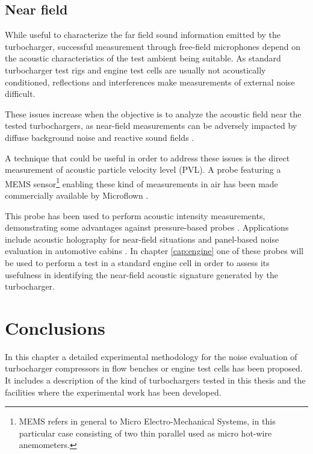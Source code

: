 \subsection{Near field} %

While useful to characterize the far field sound information emitted by the turbocharger, successful measurement through free-field microphones depend on the acoustic characteristics of the test ambient being suitable. As standard turbocharger test rigs and engine test cells are usually not acoustically conditioned, reflections and interferences make measurements of external noise difficult. 

These issues increase when the objective is to analyze the acoustic field near the tested turbochargers, as near-field measurements can be adversely impacted by diffuse background noise and reactive sound fields \cite{jacobsen1989active,elliot1981errors}. 

A technique that could be useful in order to address these issues is the direct measurement of acoustic particle velocity level (PVL). A probe featuring a MEMS sensor\footnote{MEMS refers in general to Micro Electro-Mechanical Systems, in this particular case consisting of two thin parallel used as micro hot-wire anemometers.} enabling these kind of measurements in air has been made commercially available by Microflown \cite{debree1992micro}. 

This probe has been used to perform acoustic intensity measurements, demonstrating some advantages against pressure-based probes \cite{jacobsen2005comp}. Applications include acoustic holography for near-field situations \cite{comesana2013scan} and panel-based noise evaluation in automotive cabins \cite{Wolff2009PU}. In chapter \ref{cap:engine} one of these probes will be used to perform a test in a standard engine cell in order to assess its usefulness in identifying the near-field acoustic signature generated by the turbocharger.

\section{Conclusions}
\label{sec:conclusions}

In this chapter a detailed experimental methodology for the noise evaluation of turbocharger compressors in flow benches or engine test cells has been proposed. It includes a description of the kind of turbochargers tested in this thesis and the facilities where the experimental work has been developed.

